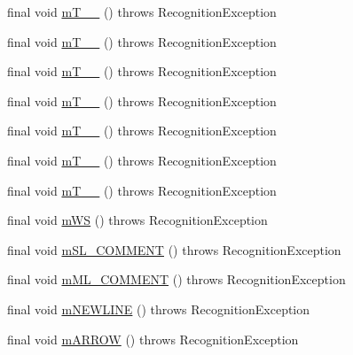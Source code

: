 \begin{DoxyCompactItemize}
final void \hyperlink{classorg_1_1tzi_1_1use_1_1parser_1_1soil_1_1_soil_lexer_a4d6cd6979b45c50c1d57d3e85aceadb5}{m\-T\-\_\-\-\_} ()  throws Recognition\-Exception 
\item 
final void \hyperlink{classorg_1_1tzi_1_1use_1_1parser_1_1soil_1_1_soil_lexer_ae0071be2645a22e356dd4622aa2ea5ee}{m\-T\-\_\-\-\_} ()  throws Recognition\-Exception 
\item 
final void \hyperlink{classorg_1_1tzi_1_1use_1_1parser_1_1soil_1_1_soil_lexer_a107e158a0b07466d3ced07a42fd65419}{m\-T\-\_\-\-\_} ()  throws Recognition\-Exception 
\item 
final void \hyperlink{classorg_1_1tzi_1_1use_1_1parser_1_1soil_1_1_soil_lexer_a917764565c596e01e80693978fc8334c}{m\-T\-\_\-\-\_} ()  throws Recognition\-Exception 
\item 
final void \hyperlink{classorg_1_1tzi_1_1use_1_1parser_1_1soil_1_1_soil_lexer_ada0c147d43dbed994c7c70d6869ea23c}{m\-T\-\_\-\-\_} ()  throws Recognition\-Exception 
\item 
final void \hyperlink{classorg_1_1tzi_1_1use_1_1parser_1_1soil_1_1_soil_lexer_a8f215c755db599c858d4dd7b2639f3ad}{m\-T\-\_\-\-\_} ()  throws Recognition\-Exception 
\item 
final void \hyperlink{classorg_1_1tzi_1_1use_1_1parser_1_1soil_1_1_soil_lexer_ac076137bd06fa18791ab343a7e33da51}{m\-T\-\_\-\-\_} ()  throws Recognition\-Exception 
\item 
final void \hyperlink{classorg_1_1tzi_1_1use_1_1parser_1_1soil_1_1_soil_lexer_a9ccb351fd5548e3bad497e159915772e}{m\-W\-S} ()  throws Recognition\-Exception 
\item 
final void \hyperlink{classorg_1_1tzi_1_1use_1_1parser_1_1soil_1_1_soil_lexer_a1997e1905f03dcf0f7b4a8bccb486025}{m\-S\-L\-\_\-\-C\-O\-M\-M\-E\-N\-T} ()  throws Recognition\-Exception 
\item 
final void \hyperlink{classorg_1_1tzi_1_1use_1_1parser_1_1soil_1_1_soil_lexer_a51bbcc0c3d1681db705749bdd5cee345}{m\-M\-L\-\_\-\-C\-O\-M\-M\-E\-N\-T} ()  throws Recognition\-Exception 
\item 
final void \hyperlink{classorg_1_1tzi_1_1use_1_1parser_1_1soil_1_1_soil_lexer_a8c78772addb53a23d5cce78b4b98c13d}{m\-N\-E\-W\-L\-I\-N\-E} ()  throws Recognition\-Exception 
\item 
final void \hyperlink{classorg_1_1tzi_1_1use_1_1parser_1_1soil_1_1_soil_lexer_a8354cdbac2963910a3ac4855171453bd}{m\-A\-R\-R\-O\-W} ()  throws Recognition\-Exception 
\item 

\end{DoxyCompactItemize}
